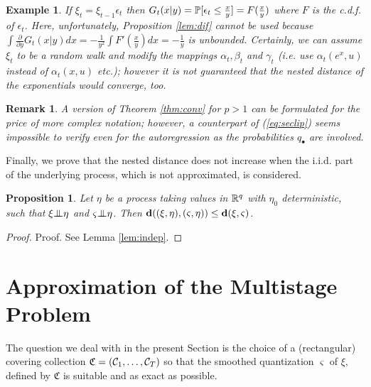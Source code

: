 \documentclass{article}              %
\newtheorem{example}{Example}
\newtheorem{proposition}{Proposition}
\newtheorem{remark}{Remark}
\begin{document}
\begin{example}
If $\xi_{t}=\xi_{t-1}\epsilon_{t}$ then $G_{t}(x|y)=\P[\epsilon_{t}\leq\frac{x}{y}]=F(\frac{x}{y})$
where $F$ is the c.d.f. of $\epsilon_{t}$. Here, unfortunately,
Proposition \ref{lem:dif} cannot be used because $\int\frac{\partial}{\partial y}G_{t}(x|y)dx=-\frac{1}{y^{2}}\int F'(\frac{x}{y})dx=-\frac{1}{y}$
is unbounded. Certainly, we can assume $\xi_{t}$ to be a random walk
and modify the mappings $\alpha_{t},\beta_{t}$ and $\gamma_{t}$
(i.e. use $\alpha_{t}(e^{x},u)$ instead of $\alpha_{t}(x,u)$ etc.);
however it is not guaranteed that the nested distance of the exponentials
would converge, too. 
\end{example}

\begin{remark}
A version of Theorem \ref{thm:conv} for $p>1$ can be formulated
for the price of more complex notation; however, a counterpart of (\ref{eq:seclip}) seems impossible to verify even
for the autoregression as the probabilities $q_{\bullet}$ are involved. 
\end{remark}

\noindent Finally, we prove that the nested distance does not increase when
the i.i.d. part of the underlying process, which is not approximated,
is considered.
\begin{proposition}
\label{prop:witheta}Let $\eta$ be a process taking values in $\R^{q}$
with $\eta_{0}$ deterministic, such that $\xi\indep{\eta}$ and $\varsigma\indep{\eta}$.
Then $\d((\xi,\eta),(\varsigma,\eta))\le\d(\xi,\varsigma)$.
\end{proposition}

\begin{proof}{Proof.}
See Lemma \ref{lem:indep}. 
\end{proof}


\section{\label{sec:approx}Approximation of the Multistage Problem}

The question we deal
with in the present Section is the choice of a (rectangular) covering
collection $\mathfrak{C}=(\C_{1},\dots,\C_{T})$ so that the smoothed
quantization $\varsigma$ of $\xi,$ defined by $\mathfrak{C}$ is
suitable and as exact as possible.
\end{document}

